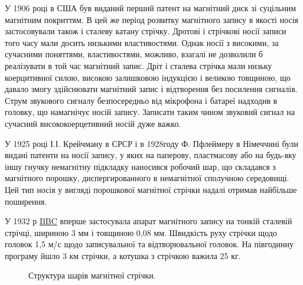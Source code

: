 \documentclass[a4paper,14pt]{extreport}
\begin{document}
  У 1906 році в США був виданий перший патент на магнітний диск зі суцільним магнітним покриттям. В цей же період розвитку
  магнітного запису в якості носія застосовували також і сталеву катану стрічку\cite{lit1}. Дротові і стрічкові носії записи того часу мали досить низькими властивостями. Однак носії з високими, за сучасними поняттями, властивостями, можливо, взагалі не дозволили б реалізувати в той час магнітний запис. Дріт і сталева стрічка мали низьку коерцитивної силою, високою залишковою індукцією і великою товщиною, що давало
  змогу здійснювати магнітний запис і відтворення без посилення сигналів. Струм звукового сигналу безпосередньо від мікрофона і батареї
  надходив в головку, що намагнічує носій запису. Записати таким чином звуковий сигнал на сучасний висококоерцетивний носій дуже важко.\par

  У 1925 році І.І. Крейчману в СРСР і в 1928году Ф. Пфлеймеру в Німеччині були видані патенти на носії запису, у яких на паперову,
  пластмасову або на будь-яку іншу гнучку немагнітну підкладку наносився робочий шар, що складався з магнітного порошку,
  диспергированного в немагнітної сполучною середовищі. Цей тип носія у вигляді порошкової магнітної стрічки надалі отримав найбільше
  поширення.\par

  У 1932 р \href{https://ru.wikipedia.org/wiki/%D0%91%D0%B8-%D0%B1%D0%B8-%D1%81%D0%B8}{BBC} вперше застосувала апарат магнітного запису на тонкій сталевій стрічці, шириною 3 мм і товщиною 0,08 мм. Швидкість руху стрічки щодо головок 1,5 м/с щодо записувальної та відтворювальної головок. На півгодинну програму йшло 3 км стрічки, а котушка з стрічкою важила 25 кг.\par
  \vspace{0.5cm}
   \begin{figure}[h]
    \caption{Структура шарів магнітної стрічки.}
    \label{ris1}
  \end{figure}
\end{document}

